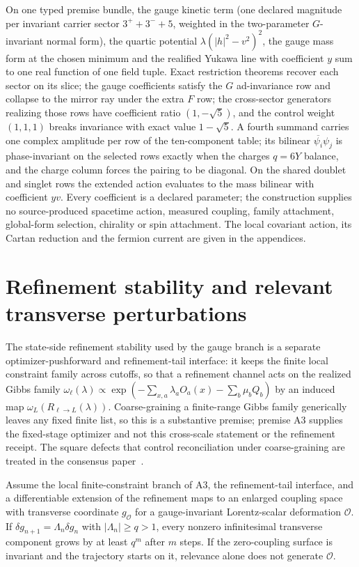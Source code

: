 \documentclass[11pt]{article}
\begin{document}
On one typed premise bundle, the gauge kinetic term (one declared magnitude
per invariant carrier sector \(3^++3^-+5\), weighted in the two-parameter
\(G\)-invariant normal form), the quartic potential \(\lambda(|h|^2-v^2)^2\),
the gauge mass form at the chosen minimum and the realified Yukawa line with
coefficient \(y\) sum to one real function of one field tuple. Exact
restriction theorems recover each sector on its slice; the gauge coefficients
satisfy the \(G\) ad-invariance row and collapse to the mirror ray under the
extra \(F\) row; the cross-sector generators realizing those rows have
coefficient ratio \((1,-\sqrt5)\), and the control weight \((1,1,1)\) breaks
invariance with exact value \(1-\sqrt5\). A fourth summand carries one complex
amplitude per row of the ten-component table; its bilinear
\(\overline{\psi_i}\psi_j\) is phase-invariant on the selected rows exactly
when the charges \(q=6Y\) balance, and the charge column forces the pairing
to be diagonal. On the shared doublet and singlet rows the extended action
evaluates to the mass bilinear with coefficient \(yv\). Every coefficient is
a declared parameter; the construction supplies no source-produced spacetime
action, measured coupling, family attachment, global-form selection, chirality
or spin attachment. The local covariant action, its Cartan reduction and the
fermion current are given in the appendices.

\section{Refinement stability and relevant transverse perturbations}
\label{sec:refinement-stability}

The state-side refinement stability used by the gauge branch is a separate
optimizer-pushforward and refinement-tail interface: it keeps the finite
local constraint family across cutoffs, so that a refinement channel acts on
the realized Gibbs family
\(\omega_\ell(\lambda)\propto\exp(-\sum_{x,a}\lambda_aO_a(x)-\sum_b\mu_bQ_b)\)
by an induced map \(\omega_L(R_{\ell\to L}(\lambda))\). Coarse-graining a
finite-range Gibbs family generically leaves any fixed finite list, so this is
a substantive premise; premise A3 supplies the fixed-stage optimizer and not
this cross-scale statement or the refinement receipt. The square defects that
control reconciliation under coarse-graining are treated in the consensus
paper~\cite{ophconsensus}.

\begin{proposition}
Assume the local finite-constraint branch of A3, the refinement-tail
interface, and a differentiable extension of the refinement maps to an
enlarged coupling space with transverse coordinate \(g_{\mathcal O}\) for a
gauge-invariant Lorentz-scalar deformation \(\mathcal O\). If
\(\delta g_{n+1}=\Lambda_n\delta g_n\) with \(|\Lambda_n|\ge q>1\), every nonzero
infinitesimal transverse component grows by at least \(q^m\) after \(m\)
steps. If the zero-coupling surface is invariant and the trajectory starts on
it, relevance alone does not generate \(\mathcal O\).
\end{proposition}
\end{document}
